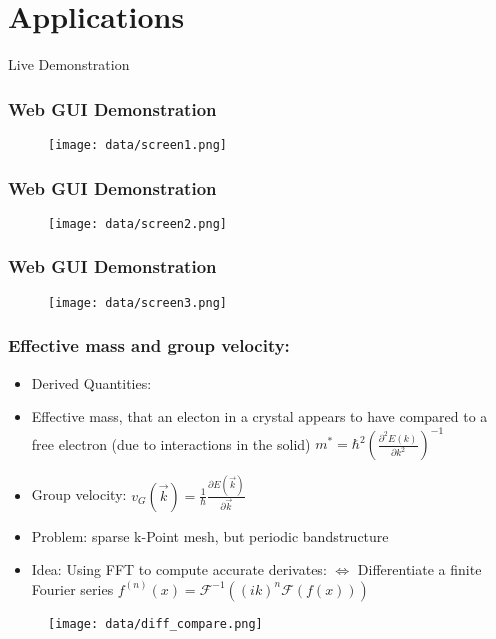 
\section{Applications}

\begin{frame}
    \begin{center}
    \Huge Live Demonstration                
    \end{center}
\end{frame}

\begin{frame}[plain]
    \frametitle{Web GUI Demonstration}
    \begin{figure}
        \texttt{[image: data/screen1.png]} 
    \end{figure}
\end{frame}

\begin{frame}[plain]
    \frametitle{Web GUI Demonstration}
    \begin{figure}
        \texttt{[image: data/screen2.png]} 
    \end{figure}
\end{frame}

\begin{frame}[plain]
    \frametitle{Web GUI Demonstration}
    \begin{figure}
        \texttt{[image: data/screen3.png]} 
    \end{figure}
\end{frame}

\begin{frame}\frametitle{Effective mass and group velocity:}
\begin{itemize}

\item Derived Quantities:

    \item Effective mass, that an electon in a crystal appears to have compared to a free electron (due to interactions in the solid)
    $m^{*} = \hbar^2  \left(\frac{\partial^2E(k)}{\partial k^2}\right)^{-1}$
    \
    \item Group velocity:
    $v_{G}(\vec{k}) = \frac{1}{\hbar}\frac{\partial E(\vec{k})}{\partial \vec{k}}$

    
    \item Problem: sparse k-Point mesh, but periodic bandstructure
    \item Idea: Using FFT to compute accurate derivates:
    \newline $\Leftrightarrow$ Differentiate a finite Fourier series
    \newline $f^{(n)}(x) = \mathcal{F}^{-1}\left((ik)^n\mathcal{F}(f(x))\right)$
\end{itemize}
\end{frame}

\begin{frame}
\begin{figure}
   \texttt{[image: data/diff\_compare.png]}
\end{figure}
\end{frame}



